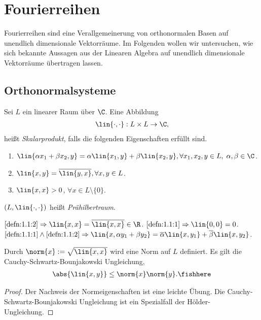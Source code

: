 \section{Fourierreihen}

Fourierreihen sind eine Verallgemeinerung von orthonormalen Basen auf unendlich
dimensionale Vektorräume. Im Folgenden wollen wir untersuchen, wie sich
bekannte Aussagen aus der Linearen Algebra auf unendlich dimensionale
Vektorräume übertragen lassen.

\subsection{Orthonormalsysteme}

\begin{defn}
\label{defn:1.1}
Sei $L$ ein linearer Raum über $\C$. Eine Abbildung
\begin{align*}
\lin{\cdot,\cdot} : L\times L \to \C,
\end{align*}
heißt \emph{Skalarprodukt}, falls die folgenden Eigenschaften erfüllt sind.
\begin{enumerate}[label=(S\arabic{*})]
  \item\label{defn:1.1:1} $\lin{\alpha x_1+\beta x_2,y} =
  \alpha\lin{x_1,y}+\beta\lin{x_2,y}, \forall x_1,x_2,y\in L,\;
  \alpha,\beta\in\C$.
  \item\label{defn:1.1:2} $\lin{x,y} = \overline{\lin{y,x}}, \forall x,y\in L$.
  \item\label{defn:1.1:3} $\lin{x,x} > 0$, $\forall x\in L\setminus\{0\}$.
\end{enumerate}
$(L,\lin{\cdot,\cdot})$ heißt \emph{Prähilbertraum}.\fishhere
\end{defn}

\begin{bem}
\label{bem:1.2}
$\ref{defn:1.1:2}\Rightarrow \lin{x,x} = \overline{\lin{x,x}} \in\R$.
$\ref{defn:1.1:1}\Rightarrow \lin{0,0} = 0$.\\
$\ref{defn:1.1:1}\land\ref{defn:1.1:2}\Rightarrow \lin{x,\alpha y_1+\beta y_2}
= \overline{\alpha}\lin{x,y_1} + \overline{\beta}\lin{x,y_2}$.\maphere
\end{bem}

\begin{prop}
\label{prop:1.3}
Durch $\norm{x} := \sqrt{\lin{x,x}}$ wird eine Norm auf $L$ definiert. Es gilt
die Cauchy-Schwartz-Bounjakowski Ungleichung,
\begin{align*}
\abs{\lin{x,y}} \le \norm{x}\norm{y}.\fishhere
\end{align*}
\end{prop}
\begin{proof}
Der Nachweis der Normeigenschaften ist eine leichte Übung. Die
Cauchy-Schwartz-Bounjakowski Ungleichung ist ein Spezialfall der
Hölder-Ungleichung.\qedhere
\end{proof}

